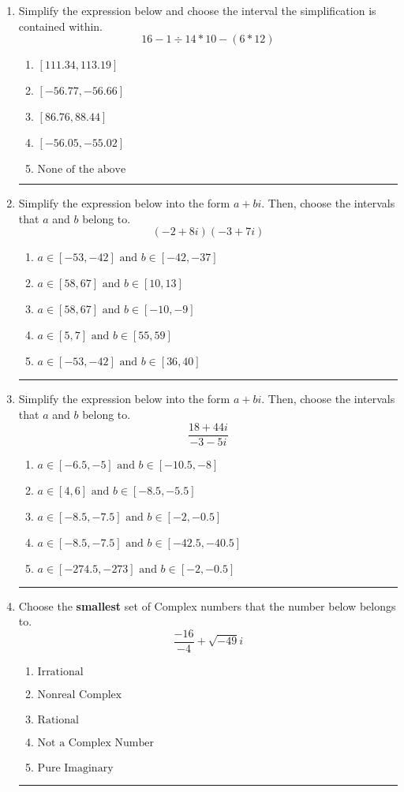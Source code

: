 \documentclass[14pt]{extbook}
\newcommand{\litem}[1]{\item#1\hspace*{-1cm}\rule{\textwidth}{0.4pt}}
\begin{document}
\begin{enumerate}
\litem{
Simplify the expression below and choose the interval the simplification is contained within.\[ 16 - 1 \div 14 * 10 - (6 * 12) \]\begin{enumerate}[label=\Alph*.]
\item \( [111.34, 113.19] \)
\item \( [-56.77, -56.66] \)
\item \( [86.76, 88.44] \)
\item \( [-56.05, -55.02] \)
\item \( \text{None of the above} \)

\end{enumerate} }
\litem{
Simplify the expression below into the form $a+bi$. Then, choose the intervals that $a$ and $b$ belong to.\[ (-2 + 8 i)(-3 + 7 i) \]\begin{enumerate}[label=\Alph*.]
\item \( a \in [-53, -42] \text{ and } b \in [-42, -37] \)
\item \( a \in [58, 67] \text{ and } b \in [10, 13] \)
\item \( a \in [58, 67] \text{ and } b \in [-10, -9] \)
\item \( a \in [5, 7] \text{ and } b \in [55, 59] \)
\item \( a \in [-53, -42] \text{ and } b \in [36, 40] \)

\end{enumerate} }
\litem{
Simplify the expression below into the form $a+bi$. Then, choose the intervals that $a$ and $b$ belong to.\[ \frac{18 + 44 i}{-3 - 5 i} \]\begin{enumerate}[label=\Alph*.]
\item \( a \in [-6.5, -5] \text{ and } b \in [-10.5, -8] \)
\item \( a \in [4, 6] \text{ and } b \in [-8.5, -5.5] \)
\item \( a \in [-8.5, -7.5] \text{ and } b \in [-2, -0.5] \)
\item \( a \in [-8.5, -7.5] \text{ and } b \in [-42.5, -40.5] \)
\item \( a \in [-274.5, -273] \text{ and } b \in [-2, -0.5] \)

\end{enumerate} }
\litem{
Choose the \textbf{smallest} set of Complex numbers that the number below belongs to.\[ \frac{-16}{-4}+\sqrt{-49}i \]\begin{enumerate}[label=\Alph*.]
\item \( \text{Irrational} \)
\item \( \text{Nonreal Complex} \)
\item \( \text{Rational} \)
\item \( \text{Not a Complex Number} \)
\item \( \text{Pure Imaginary} \)


\end{enumerate}}
\end{enumerate}
\end{document}
